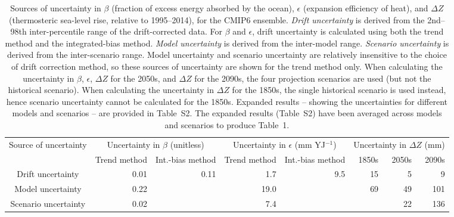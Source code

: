 \begin{table*}[t]
\centering
\caption{Sources of uncertainty in $\beta$ (fraction of excess energy absorbed by the ocean), $\epsilon$ (expansion efficiency of heat), and $\Delta Z$ (thermosteric sea-level rise, relative to 1995--2014), for the CMIP6 ensemble. \emph{Drift uncertainty} is derived from the 2nd--98th inter-percentile range of the drift-corrected data. For $\beta$ and $\epsilon$, drift uncertainty is calculated using both the trend method and the integrated-bias method. \emph{Model uncertainty} is derived from the inter-model range. \emph{Scenario uncertainty} is derived from the inter-scenario range. Model uncertainty and scenario uncertainty are relatively insensitive to the choice of drift correction method, so these sources of uncertainty are shown for the trend method only. When calculating the uncertainty in $\beta$, $\epsilon$, $\Delta Z$ for the 2050s, and $\Delta Z$ for the 2090s, the four projection scenarios are used (but not the historical scenario). When calculating the uncertainty in $\Delta Z$ for the 1850s, the single historical scenario is used instead, hence scenario uncertainty cannot be calculated for the 1850s. Expanded results -- showing the uncertainties for different models and scenarios -- are provided in Table~S2. The expanded results (Table~S2) have been averaged across models and scenarios to produce Table~1.}
\begin{tabular}{c|rr|rr|rrr}
\toprule
Source of uncertainty & \multicolumn{2}{c|}{Uncertainty in $\beta$ (unitless)} & \multicolumn{2}{c|}{Uncertainty in $\epsilon$ (mm YJ$^{-1}$)} & \multicolumn{3}{c}{Uncertainty in $\Delta Z$ (mm)} \\
 & Trend method & Int.-bias method & Trend method & Int.-bias method & 1850s & 2050s & 2090s \\
\midrule
Drift uncertainty & 0.01 & 0.11 & 1.7 & 9.5 & 15 & 5 & 9 \\
Model uncertainty & 0.22 &  & 19.0 &  & 69 & 49 & 101 \\
Scenario uncertainty & 0.02 &  & 7.4 &  &  & 22 & 136 \\
\bottomrule
\end{tabular}
\end{table*}
